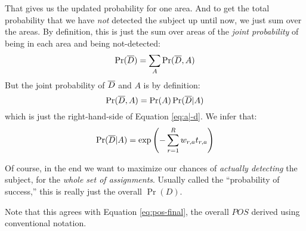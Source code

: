 That gives us the updated probability for one area. And to get the
total probability that we have \emph{not} detected the subject up
until now, we just sum over the areas. By definition, this is just the
sum over areas of the \emph{joint probability} of being in each area
and being not-detected:
\begin{equation}
  \label{eq:6}
  \Pr(\overline{D}) = \sum_A \Pr(\overline{D},A)
\end{equation}
But the joint probability of $\overline{D}$ and $A$ is by definition: 
\begin{equation}
  \label{eq:8}
  \Pr(\overline{D},A) =  \Pr(A) \Pr(\overline{D}|A)
\end{equation}
which is just the right-hand-side of Equation \ref{eq:a|-d}. We
infer that:
\begin{equation}
  \label{eq:-d|a}
  \Pr(\overline{D}|A) = \exp\left(-\sum_{r=1}^R w_{r,a} t_{r,a}\right)
\end{equation}

Of course, in the end we want to maximize our chances of \emph{actually
  detecting} the subject, for the \emph{whole set of
  assignments}. Usually called the ``probability of success,'' this is
really just the overall $\Pr(D)$.


Note that this agrees with Equation \ref{eq:pos-final}, the overall
$POS$ derived using conventional notation.




